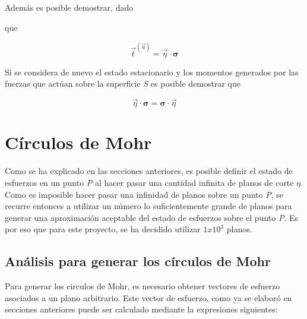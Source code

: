 \documentclass{article}
\begin{document}
    Adem\'{a}s es posible demostrar, dado


    que

    \begin{equation}
        \vec{t}^{(\vec{\eta})} = \vec{\eta}\cdot\bm{\sigma}
    \end{equation}


    Si se considera de nuevo el estado estacionario y los momentos generados por las fuerzas
    que act\'{u}an sobre la superficie \textit{S} es posible demostrar que

    \begin{equation}
        \vec{\eta}\cdot\bm{\sigma} = \bm{\sigma}\cdot\vec{\eta}
    \end{equation}


    \section{Círculos de Mohr}
    Como se ha explicado en las secciones anteriores, es posible definir el estado de esfuerzos
    en un punto \textit{P} al hacer pasar una cantidad infinita de planos de corte $\eta$.
    Como es imposible hacer pasar una infinidad de planos sobre un punto \textit{P}, se recurre
    entonces a utilizar un n\'{u}mero lo suficientemente grande de planos para generar una
    aproximaci\'{o}n aceptable del estado de esfuerzos sobre el punto \textit{P}. Es por eso
    que para este proyecto, se ha decidido utilizar $1x10^3$ planos.

    \subsection{An\'{a}lisis para generar los círculos de Mohr}
    
    Para generar los circulos de Mohr, es necesario obtener vectores de esfuerzo asociados a
    un plano arbitrario. Este vector de esfuerzo, como ya se elabor\'{o} en secciones
    anteriores puede ser calculado mediante la expresiones siguientes:
    
\end{document}

